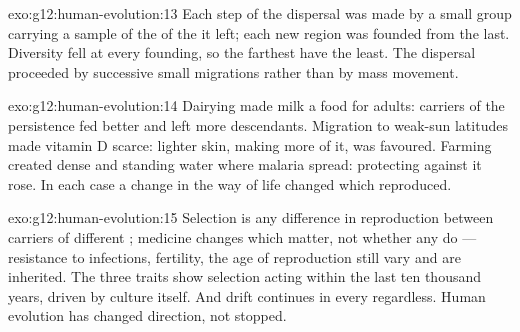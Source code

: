 \begin{solution}{exo:g12:human-evolution:13}
Each step of the dispersal was made by a small group carrying a sample
of the  of the  it left; each new region was founded
from the last. Diversity fell at every founding, so the farthest
 have the least. The dispersal proceeded by successive
small migrations rather than by mass movement.
\end{solution}

\begin{solution}{exo:g12:human-evolution:14}
Dairying made milk a food for adults: carriers of the persistence
 fed better and left more descendants. Migration to weak-sun
latitudes made vitamin D scarce: lighter skin, making more of it, was
favoured. Farming created dense  and standing water where
malaria spread:  protecting against it rose. In each case a
change in the way of life changed which  reproduced.
\end{solution}

\begin{solution}{exo:g12:human-evolution:15}
Selection is any difference in reproduction between carriers of
different ; medicine changes which  matter, not whether
any do --- resistance to infections, fertility, the age of
reproduction still vary and are inherited. The three traits show
selection acting within the last ten thousand years, driven by culture
itself. And drift continues in every  regardless. Human
evolution has changed direction, not stopped.
\end{solution}

